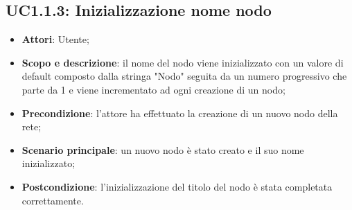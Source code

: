 \subsection{UC1.1.3: Inizializzazione nome nodo}
\hypertarget{UC1.1.3}{}  
\begin{itemize} 
	\item{\textbf{Attori}: Utente;} 
	\item{\textbf{Scopo e descrizione}: il nome del nodo viene inizializzato con un valore di default composto dalla stringa "Nodo" seguita da un numero progressivo che parte da 1 e viene incrementato ad ogni creazione di un nodo;} 
	\item{\textbf{Precondizione}: l'attore ha effettuato la creazione di un nuovo nodo della rete;}
	\item{\textbf{Scenario principale}: un nuovo nodo è stato creato e il suo nome inizializzato;} 
	\item{\textbf{Postcondizione}: l'inizializzazione del titolo del nodo è stata completata correttamente.} 
\end{itemize} 

